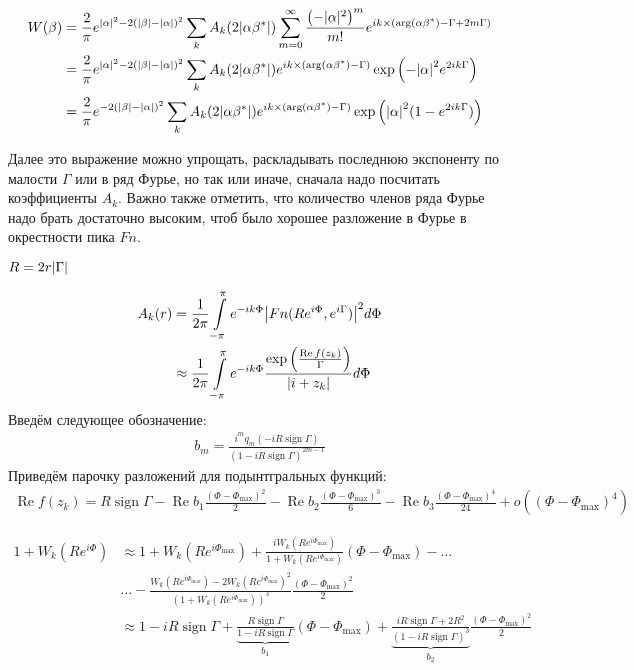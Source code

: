 \documentclass[a4paper, 12pt]{article}
\DeclareMathOperator*{\sign}{sign}
\DeclareMathOperator*{\Real}{Re}
\newenvironment{eqw}{\begin{equation} \begin{aligned}}   
    {\end{aligned}    \end{equation}}
\begin{document}
\begin{eqw}
    W(\beta) &= \frac{2}{\pi}e^{\abs{\alpha}^2-2\left(\abs{\beta} - \abs{\alpha}\right)^2}
    \sum\limits_k A_k(2\abs{\alpha\beta^*})
    \sum\limits_{m=0}^{\infty} \frac{\left(-|\alpha|^2\right)^m}{m!}e^{ik\times\left(\arg(\alpha\beta^*) -\Gamma + 2m\Gamma\right)}\\
    &= \frac{2}{\pi}e^{\abs{\alpha}^2-2\left(\abs{\beta} - \abs{\alpha}\right)^2}
    \sum\limits_k A_k(2\abs{\alpha\beta^*})e^{ik\times\left(\arg(\alpha\beta^*) -\Gamma\right)}
    \exp\left(-\abs{\alpha}^2 e^{2ik\Gamma}\right)\\
    &= \frac{2}{\pi}e^{-2\left(\abs{\beta} - \abs{\alpha}\right)^2}
    \sum\limits_k A_k(2\abs{\alpha\beta^*})e^{ik\times\left(\arg(\alpha\beta^*) -\Gamma\right)}
    \exp\left(\abs{\alpha}^2 (1-e^{2ik\Gamma})\right)
\end{eqw}

Далее это выражение можно упрощать, раскладывать последнюю экспоненту по малости $\Gamma$ или в ряд Фурье, но так или иначе, сначала надо посчитать коэффициенты $A_k$. Важно также отметить, что количество членов ряда Фурье надо брать достаточно высоким, чтоб было хорошее разложение в Фурье в окрестности пика $Fn$. 

$R=2r\abs{\Gamma}$

\begin{eqw}
     A_k(r) &= \frac{1}{2\pi}\int\limits_{-\pi}^\pi e^{-ik\Phi} \abs{Fn(Re^{i\Phi}, e^{i\Gamma})}^2 d\Phi \\
    &\approx \frac{1}{2\pi}\int\limits_{-\pi}^\pi e^{-ik\Phi} 
    \frac{\exp\left(\frac{\Real f(z_k)}{\Gamma}\right)}{\abs{i+z_k}}d\Phi 
\end{eqw}
Введём следующее обозначение:
\begin{eqw}
    b_m = \frac{i^m q_m(-iR\sign\Gamma)}{\left(1-iR\sign \Gamma\right)^{2m-1}}
\end{eqw}
Приведём парочку разложений для подынтгральных функций:
\begin{eqw}
    \Real f(z_k) = R\sign\Gamma - \Real b_1 \frac{\left(\Phi - \Phi_{\max}\right)^2}{2} - \Real b_2 \frac{\left(\Phi - \Phi_{\max}\right)^3}{6} - \Real b_3 \frac{\left(\Phi - \Phi_{\max}\right)^4}{24}+o\left(\left(\Phi - \Phi_{\max}\right)^4\right)
\end{eqw}

\begin{eqw}
     1+W_k(Re^{i\Phi}) &\approx 1+W_k(Re^{i\Phi_{\max}}) + 
     \frac{iW_k(Re^{i\Phi_{\max}})}{1+W_k(Re^{i\Phi_{\max}})}\left(\Phi - \Phi_{\max}\right) - \dots\\
     &\dots-\frac{W_k(Re^{i\Phi_{\max}}) - 2W_k(Re^{i\Phi_{\max}})^2}{\left(1+W_k(Re^{i\Phi_{\max}})\right)^3}\frac{\left(\Phi - \Phi_{\max}\right)^2}{2}\\
     &\approx 1- i R \sign \Gamma + \underbrace{\frac{R \sign \Gamma}{1-i R \sign \Gamma}}_{b_1}\left(\Phi - \Phi_{\max}\right) +
     \underbrace{\frac{i R \sign \Gamma + 2 R^2}{\left(1-i R \sign \Gamma\right)^3}}_{b_2}\frac{\left(\Phi - \Phi_{\max}\right)^2}{2}
\end{eqw}
\end{document}
